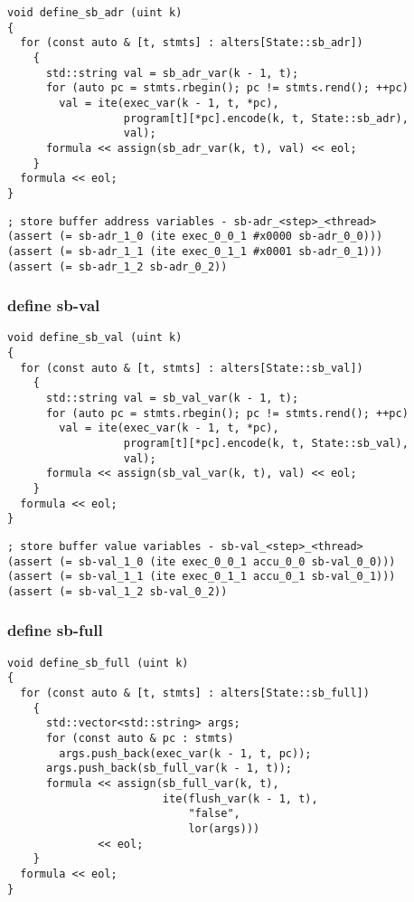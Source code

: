 \begin{lstlisting}[style=c++]
void define_sb_adr (uint k)
{
  for (const auto & [t, stmts] : alters[State::sb_adr])
    {
      std::string val = sb_adr_var(k - 1, t);
      for (auto pc = stmts.rbegin(); pc != stmts.rend(); ++pc)
        val = ite(exec_var(k - 1, t, *pc),
                  program[t][*pc].encode(k, t, State::sb_adr),
                  val);
      formula << assign(sb_adr_var(k, t), val) << eol;
    }
  formula << eol;
}
\end{lstlisting}

\begin{lstlisting}[language=SMTLib]
; store buffer address variables - sb-adr_<step>_<thread>
(assert (= sb-adr_1_0 (ite exec_0_0_1 #x0000 sb-adr_0_0)))
(assert (= sb-adr_1_1 (ite exec_0_1_1 #x0001 sb-adr_0_1)))
(assert (= sb-adr_1_2 sb-adr_0_2))
\end{lstlisting}

\subsubsection{define sb-val}

\begin{lstlisting}[style=c++]
void define_sb_val (uint k)
{
  for (const auto & [t, stmts] : alters[State::sb_val])
    {
      std::string val = sb_val_var(k - 1, t);
      for (auto pc = stmts.rbegin(); pc != stmts.rend(); ++pc)
        val = ite(exec_var(k - 1, t, *pc),
                  program[t][*pc].encode(k, t, State::sb_val),
                  val);
      formula << assign(sb_val_var(k, t), val) << eol;
    }
  formula << eol;
}
\end{lstlisting}

\begin{lstlisting}[language=SMTLib]
; store buffer value variables - sb-val_<step>_<thread>
(assert (= sb-val_1_0 (ite exec_0_0_1 accu_0_0 sb-val_0_0)))
(assert (= sb-val_1_1 (ite exec_0_1_1 accu_0_1 sb-val_0_1)))
(assert (= sb-val_1_2 sb-val_0_2))
\end{lstlisting}

\subsubsection{define sb-full}

\begin{lstlisting}[style=c++]
void define_sb_full (uint k)
{
  for (const auto & [t, stmts] : alters[State::sb_full])
    {
      std::vector<std::string> args;
      for (const auto & pc : stmts)
        args.push_back(exec_var(k - 1, t, pc));
      args.push_back(sb_full_var(k - 1, t));
      formula << assign(sb_full_var(k, t),
                        ite(flush_var(k - 1, t),
                            "false",
                            lor(args)))
              << eol;
    }
  formula << eol;
}
\end{lstlisting}

